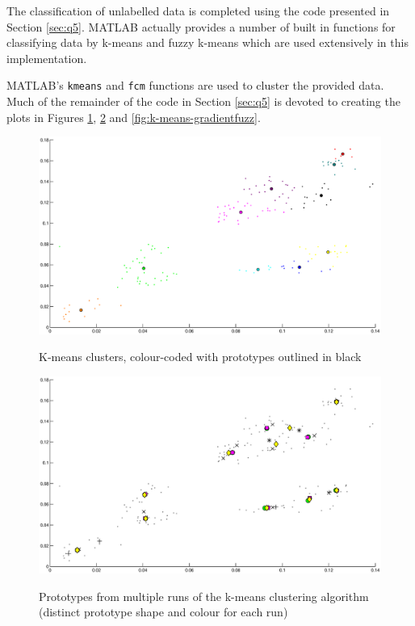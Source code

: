 The classification of unlabelled data is completed using the code presented in
Section \ref{sec:q5}. MATLAB actually provides a number of built in functions
for classifying data by k-means and fuzzy k-means
which are used extensively in this implementation.

MATLAB's \texttt{kmeans} and \texttt{fcm} functions are used to cluster the
provided data. Much of the remainder of the code in Section \ref{sec:q5} is
devoted to creating the plots in Figures \ref{fig:k-means-clear}, \ref{fig:k-means-multifuzz} and \ref{fig:k-means-gradientfuzz}.

\begin{figure}
\includegraphics[width=\textwidth]{images/clear-coloured}
\label{fig:k-means-clear}
\caption{K-means clusters, colour-coded with prototypes outlined in black}
\end{figure}

\begin{figure}
\includegraphics[width=\textwidth]{images/fuzzy-multiple}
\label{fig:k-means-multifuzz}
\caption{Prototypes from multiple runs of the k-means clustering algorithm
(distinct prototype shape and colour for each run)}
\end{figure}

